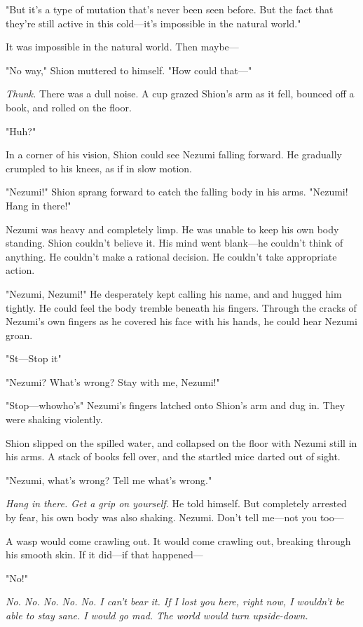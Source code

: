 "But it's a type of mutation that's never been seen before. But the fact
that they're still active in this cold---it's impossible in the natural
world."

It was impossible in the natural world. Then maybe---

"No way," Shion muttered to himself. "How could that---"

\emph{Thunk.} There was a dull noise. A cup grazed Shion's arm as it fell,
bounced off a book, and rolled on the floor.

"Huh?"

In a corner of his vision, Shion could see Nezumi falling forward. He
gradually crumpled to his knees, as if in slow motion.

"Nezumi!" Shion sprang forward to catch the falling body in his arms.
"Nezumi! Hang in there!"

Nezumi was heavy and completely limp. He was unable to keep his own body
standing. Shion couldn't believe it. His mind went blank---he couldn't
think of anything. He couldn't make a rational decision. He couldn't
take appropriate action.

"Nezumi, Nezumi!" He desperately kept calling his name, and and hugged
him tightly. He could feel the body tremble beneath his fingers. Through
the cracks of Nezumi's own fingers as he covered his face with his
hands, he could hear Nezumi groan.

"St---Stop it\el "

"Nezumi? What's wrong? Stay with me, Nezumi!"

"Stop---who\el who's\el " Nezumi's fingers latched onto Shion's arm and dug
in. They were shaking violently.

Shion slipped on the spilled water, and collapsed on the floor with
Nezumi still in his arms. A stack of books fell over, and the startled
mice darted out of sight.

"Nezumi, what's wrong? Tell me what's wrong."

\emph{Hang in there. Get a grip on yourself.} He told himself. But completely
arrested by fear, his own body was also shaking. Nezumi. Don't tell
me---not you too---

A wasp would come crawling out. It would come crawling out, breaking
through his smooth skin. If it did---if that happened---

"No!"

\emph{No. No. No. No. No. I can't bear it. If I lost you here, right now, I
wouldn't be able to stay sane. I would go mad. The world would turn
upside-down.}

